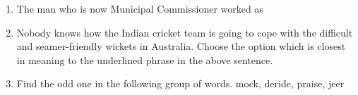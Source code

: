 \documentclass[journal,12pt,onecolumn]{IEEEtran}
\theoremstyle{remark}
\begin{document}
\begin{enumerate}[start=1, label=Q.\arabic*]
    \item The man who is now Municipal Commissioner worked as
    \begin{enumerate}
    \end{enumerate}

    \hfill{}

    \item Nobody knows how the Indian cricket team is going to cope with the difficult and seamer-friendly wickets in Australia.
    Choose the option which is closest in meaning to the underlined phrase in the above sentence.
    \begin{enumerate}
    \end{enumerate}

    \hfill{}

    \item Find the odd one in the following group of words.
    mock, deride, praise, jeer
    \begin{enumerate}
    \end{enumerate}

    \hfill{}


\end{enumerate}
\end{document}
